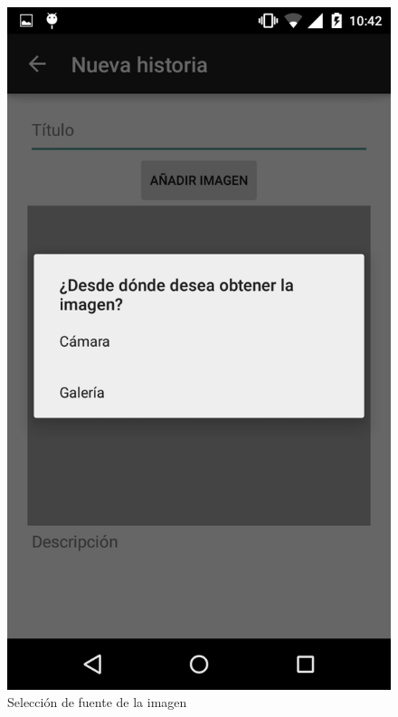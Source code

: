\documentclass[11pt,a4paper, titlepage]{article}
\begin{document}
		\begin{figure}[hbtp]
			\centering
			\includegraphics[scale = 0.25 ]{img/12}
			\caption{Selección de fuente de la imagen}
			\label{p18}
		\end{figure}
		
\end{document}
